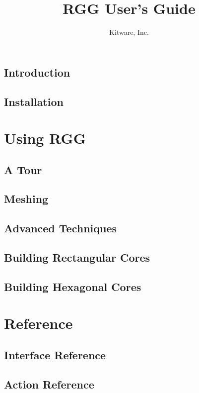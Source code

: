 \documentclass[letterpaper,10pt,draft]{book}
\title{RGG User's Guide}
\author{Kitware, Inc.}
\begin{document}
\maketitle
\tableofcontents

\chapter{Introduction}
\label{chapter:Introduction}


\chapter{Installation}
\label{Installation}


\part{Using RGG}

\chapter{A Tour}
\label{chapter:ATour}



\chapter{Meshing}
\label{chapter:Meshing}




\chapter{Advanced Techniques}
\label{chapter:AdvancedTechniques}

\chapter{Building Rectangular Cores}
\label{chapter:ExampleBuildingARectangularCore}


\chapter{Building Hexagonal Cores}
\label{chapter:ExampleBuildingAHexagonalCore}


\part{Reference}
\chapter{Interface Reference}
\chapter{Action Reference}
\end{document}
